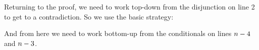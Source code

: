 Returning to the proof, we need to work top-down from the disjunction on line 2 to get to a contradiction. So we use the basic strategy:
\begin{gproof}
\end{gproof}
\noindent{}And from here we need to work bottom-up from the conditionals on lines $n-4$ and $n-3$. 
\begin{gproof}
\end{gproof}
